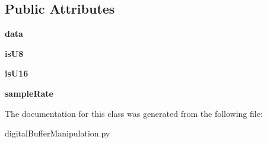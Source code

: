 \subsection*{Public Attributes}
\begin{DoxyCompactItemize}
\item 
\hypertarget{class_chassis_8git_1_1digital_buffer_manipulation_1_1digital_buffer_manipulation_a54c48c599f455ba0811a6b4c0052a0c6}{{\bfseries data}}\label{class_chassis_8git_1_1digital_buffer_manipulation_1_1digital_buffer_manipulation_a54c48c599f455ba0811a6b4c0052a0c6}

\item 
\hypertarget{class_chassis_8git_1_1digital_buffer_manipulation_1_1digital_buffer_manipulation_a20ca0cf87199a208627a00890d2ed58a}{{\bfseries is\-U8}}\label{class_chassis_8git_1_1digital_buffer_manipulation_1_1digital_buffer_manipulation_a20ca0cf87199a208627a00890d2ed58a}

\item 
\hypertarget{class_chassis_8git_1_1digital_buffer_manipulation_1_1digital_buffer_manipulation_a27acf67d067e906a9849f40269c8c8b2}{{\bfseries is\-U16}}\label{class_chassis_8git_1_1digital_buffer_manipulation_1_1digital_buffer_manipulation_a27acf67d067e906a9849f40269c8c8b2}

\item 
\hypertarget{class_chassis_8git_1_1digital_buffer_manipulation_1_1digital_buffer_manipulation_ab9930a8a75b6a28e94260a070fbcbd91}{{\bfseries sample\-Rate}}\label{class_chassis_8git_1_1digital_buffer_manipulation_1_1digital_buffer_manipulation_ab9930a8a75b6a28e94260a070fbcbd91}

\end{DoxyCompactItemize}


The documentation for this class was generated from the following file\-:\begin{DoxyCompactItemize}
\item 
digital\-Buffer\-Manipulation.\-py\end{DoxyCompactItemize}
